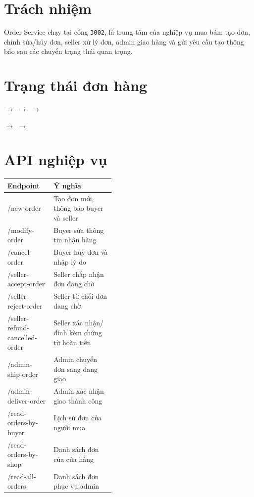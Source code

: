 \documentclass[12pt]{article}
\begin{document}

\section{Trách nhiệm}
Order Service chạy tại cổng \texttt{3002}, là trung tâm của nghiệp vụ mua bán: tạo đơn, chỉnh sửa/hủy đơn, seller xử lý đơn, admin giao hàng và gửi yêu cầu tạo thông báo sau các chuyển trạng thái quan trọng.

\section{Trạng thái đơn hàng}
\begin{center}
 $\longrightarrow$  $\longrightarrow$  $\longrightarrow$ 

\vspace{10pt}
 $\longrightarrow$ 
\qquad
{} $\longrightarrow$ 
\end{center}

\section{API nghiệp vụ}
\begin{tabularx}{\linewidth}{>{\ttfamily}p{0.43\linewidth} X}
\toprule
Endpoint & Ý nghĩa \\
\midrule
/new-order & Tạo đơn mới, thông báo buyer và seller \\
/modify-order & Buyer sửa thông tin nhận hàng \\
/cancel-order & Buyer hủy đơn và nhập lý do \\
/seller-accept-order & Seller chấp nhận đơn đang chờ \\
/seller-reject-order & Seller từ chối đơn đang chờ \\
/seller-refund-cancelled-order & Seller xác nhận/đính kèm chứng từ hoàn tiền \\
/admin-ship-order & Admin chuyển đơn sang đang giao \\
/admin-deliver-order & Admin xác nhận giao thành công \\
/read-orders-by-buyer & Lịch sử đơn của người mua \\
/read-orders-by-shop & Danh sách đơn của cửa hàng \\
/read-all-orders & Danh sách đơn phục vụ admin \\
\bottomrule
\end{tabularx}
\end{document}
